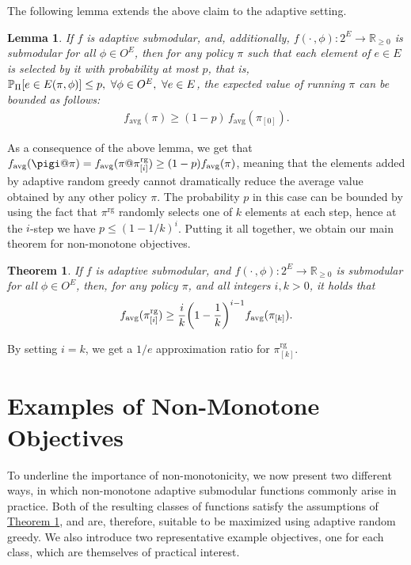 \documentclass{article}
\newcommand{\theoremref}[1]{\hyperref[#1]{Theorem \ref*{#1}}}
\newtheorem{theorem}{Theorem}
\newtheorem{lemma}{Lemma}
\let\originalleft\left
\let\originalright\right
\renewcommand{\left}{\mathopen{}\mathclose\bgroup\originalleft}
\renewcommand{\right}{\aftergroup\egroup\originalright}
\newcommand{\pio}{\pi_{[0]}}
\newcommand{\pik}{\pi_{[k]}}
\newcommand{\pig}{\pi^{\textrm{rg}}}
\newcommand{\pigi}{\pi^{\textrm{rg}}_{[i]}}
\newcommand{\pigk}{\pi^{\textrm{rg}}_{[k]}}
\newcommand{\favg}{f_{\mathrm{avg}}}
\begin{document}
The following lemma extends the above claim to the adaptive setting.
\begin{lemma}
  If $f$ is adaptive submodular, and, additionally, $f(\cdot\,, \phi) : 2^E \to \mathbb{R}_{\geq 0}$ is submodular for all $\phi \in O^E$, then for any policy $\pi$ such that each element of $e \in E$ is selected by it with probability at most $p$, that is, $\P[\Pi]{e \in E(\pi, \phi)} \leq p,\ \forall \phi \in O^E,\ \forall e \in E$, the expected value of running $\pi$ can be bounded as follows:
\begin{align*}
  \favg(\pi) \geq (1-p)\,\favg(\pio).
\end{align*}
\end{lemma}

As a consequence of the above lemma, we get that $\favg(\pigi@\pi) = \favg(\pi@\pigi) \geq (1-p)\favg(\pi)$, meaning that the elements added by adaptive random greedy cannot dramatically reduce the average value obtained by any other policy $\pi$.
The probability $p$ in this case can be bounded by using the fact that $\pig$ randomly selects one of $k$ elements at each step, hence at the $i$-step we have $p \leq (1-1/k)^i$.
Putting it all together, we obtain our main theorem for non-monotone objectives.
\begin{theorem}\label{thm:nonm}
  If $f$ is adaptive submodular, and $f(\cdot\,, \phi) : 2^E \to \mathbb{R}_{\geq 0}$ is submodular for all $\phi \in O^E$, then, for any policy $\pi$, and all integers $i, k > 0$, it holds that
  \begin{align*}
    \favg(\pigi) \geq \frac{i}{k}\left(1 - \frac{1}{k}\right)^{i-1}\favg(\pik).
  \end{align*}
\end{theorem}
\noindent By setting $i = k$, we get a $1/e$ approximation ratio for $\pigk$.

\section{Examples of Non-Monotone Objectives} \label{sect:functions}
To underline the importance of non-monotonicity, we now present two different ways, in which non-monotone adaptive submodular functions commonly arise in practice.
Both of the resulting classes of functions satisfy the assumptions of \theoremref{thm:nonm}, and are, therefore, suitable to be maximized using adaptive random greedy.
We also introduce two representative example objectives, one for each class, which are themselves of practical interest.
\end{document}
